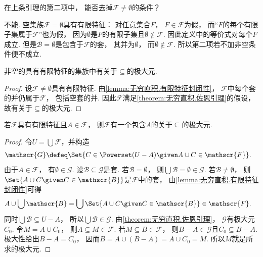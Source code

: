 \begin{example}
    在上条引理的第二项中，
    能否去掉\(\mathscr{F}\neq\emptyset\)的条件？
    \begin{solution}
        不能.
        空集族\(\mathscr{F}=\emptyset\)具有有限特征：
        对任意集合\(F\)，
        \(F\in\mathscr{F}\)为假，
        而“\(F\)的每个有限子集属于\(\mathscr{F}\)”也为假，
        因为\(\emptyset\)是\(F\)的有限子集且\(\emptyset\notin\mathscr{F}\).
        因此定义中的等价式对每个\(F\)成立.
        但是\(\mathscr{B}=\emptyset\)是包含于\(\mathscr{F}\)的套，
        其并为\(\emptyset\)，
        而\(\emptyset\notin\mathscr{F}\).
        所以第二项若不加非空条件便不成立.
    \end{solution}
\end{example}

\begin{theorem}[图基引理]
    非空的具有有限特征的集族中有关于\(\subseteq\)的极大元.
    \begin{proof}
        设\(\mathscr{F}\neq\emptyset\)具有有限特征.
        由\cref{lemma:无穷直积.有限特征封闭性}，
        \(\mathscr{F}\)中每个套的并仍属于\(\mathscr{F}\)，
        包括空套的并.
        因此\(\mathscr{F}\)满足\cref{theorem:无穷直积.佐恩引理}的假设，
        故有关于\(\subseteq\)的极大元.
    \end{proof}
\end{theorem}

\begin{corollary}
    若\(\mathscr{F}\)具有有限特征且\(A\in\mathscr{F}\)，
    则\(\mathscr{F}\)有一个包含\(A\)的关于\(\subseteq\)的极大元.
    \begin{proof}
        令\(U=\bigcup\mathscr{F}\)，并构造
        \begin{align*}
            \mathscr{G}&\defeq\Set{C\in\Powerset(U-A)\given A\cup C\in\mathscr{F}}.
        \end{align*}
        由于\(A\in\mathscr{F}\)，
        有\(\emptyset\in\mathscr{G}\).
        设\(\mathscr{B}\subseteq\mathscr{G}\)是套.
        若\(\mathscr{B}=\emptyset\)，
        则\(\bigcup\mathscr{B}=\emptyset\in\mathscr{G}\).
        若\(\mathscr{B}\neq\emptyset\)，
        则\(\Set{A\cup C\given C\in\mathscr{B}}\)是\(\mathscr{F}\)中的套，
        由\cref{lemma:无穷直积.有限特征封闭性}可得
        \begin{align*}
            A\cup\bigcup\mathscr{B}
            &=\bigcup\Set{A\cup C\given C\in\mathscr{B}}\in\mathscr{F}.
        \end{align*}
        同时\(\bigcup\mathscr{B}\subseteq U-A\)，
        所以\(\bigcup\mathscr{B}\in\mathscr{G}\).
        由\cref{theorem:无穷直积.佐恩引理}，
        \(\mathscr{G}\)有极大元\(C_0\).
        令\(M=A\cup C_0\)，
        则\(A\subseteq M\in\mathscr{F}\).
        若\(M\subseteq B\in\mathscr{F}\)，
        则\(B-A\in\mathscr{G}\)且\(C_0\subseteq B-A\).
        极大性给出\(B-A=C_0\)，
        因而\(B=A\cup(B-A)=A\cup C_0=M\).
        所以\(M\)就是所求的极大元.
    \end{proof}
\end{corollary}

